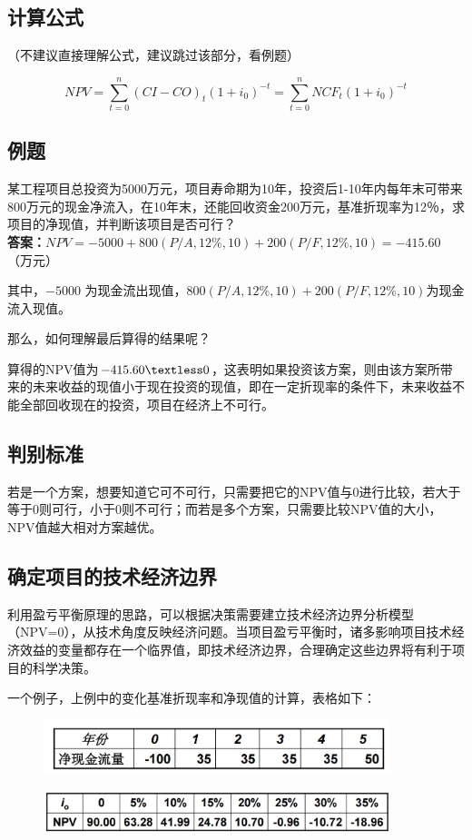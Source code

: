 \subsection{计算公式}
（不建议直接理解公式，建议跳过该部分，看例题）

$$NPV=\sum_{t=0}^{n}(CI-CO)_t(1+i_0)^{-t}=\sum_{t=0}^{n}NCF_t(1+i_0)^{-t}$$

\subsection{例题}
某工程项目总投资为5000万元，项目寿命期为10年，投资后1-10年内每年末可带来800万元的现金净流入，在10年末，还能回收资金200万元，基准折现率为12％，求项目的净现值，并判断该项目是否可行？\\
\textbf{答案：}$NPV = −5000 +800(P / A,12\%,10) + 200(P / F,12\%,10)= −415.60$（万元）

其中，$-5000$ 为现金流出现值，$800(P / A,12\%,10) + 200(P / F,12\%,10)$为现金流入现值。

那么，如何理解最后算得的结果呢？

算得的NPV值为$-415.60 \textless 0$，这表明如果投资该方案，则由该方案所带来的未来收益的现值小于现在投资的现值，即在一定折现率的条件下，未来收益不能全部回收现在的投资，项目在经济上不可行。

\subsection{判别标准}
若是一个方案，想要知道它可不可行，只需要把它的NPV值与0进行比较，若大于等于0则可行，小于0则不可行；而若是多个方案，只需要比较NPV值的大小，NPV值越大相对方案越优。

\subsection{确定项目的技术经济边界}
利用盈亏平衡原理的思路，可以根据决策需要建立技术经济边界分析模型（NPV=0），从技术角度反映经济问题。当项目盈亏平衡时，诸多影响项目技术经济效益的变量都存在一个临界值，即技术经济边界，合理确定这些边界将有利于项目的科学决策。

一个例子，上例中的变化基准折现率和净现值的计算，表格如下：
\begin{figure}[H]
    \centering
    \includegraphics[width=0.9\textwidth]{image/年份-净现金流量.png}
    \label{fig:13}
\end{figure}
\begin{figure}[H]
    \centering
    \includegraphics[width=0.9\textwidth]{image/i0-NPV.png}
    \label{fig:14}
\end{figure}

